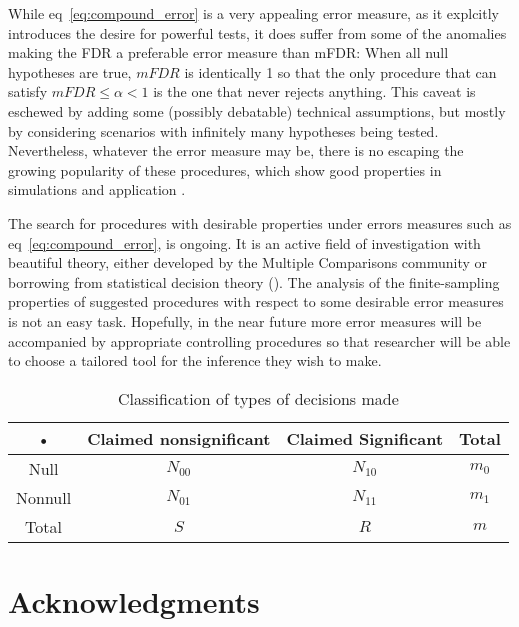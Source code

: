 \documentclass[draft,12pt]{article}
\begin{document}
While eq~\ref{eq:compound_error} is a very appealing error measure, as it explcitly introduces the desire for powerful tests, it does suffer from some of the anomalies making the FDR a preferable error measure than mFDR: When all null hypotheses are true, $mFDR$ is identically 1 so that the only procedure that can satisfy $mFDR\leq \alpha <1$ is the one that never rejects anything. This caveat is eschewed by adding some (possibly debatable) technical assumptions, but mostly by considering scenarios with infinitely many hypotheses being tested. Nevertheless, whatever the error measure may be, there is no escaping the growing popularity of these procedures, which show good properties in simulations and application \citep[example][]{efron_microarrays_2008}.

The search for procedures with desirable properties under errors measures such as eq~\ref{eq:compound_error}, is ongoing. It is an active field of investigation with beautiful theory, either developed by the Multiple Comparisons community or borrowing from statistical decision theory (\cite[see][]{sun_oracle_2007}). The analysis of the finite-sampling properties of suggested procedures with respect to some desirable error measures is not an easy task. Hopefully, in the near future more error measures will be accompanied by appropriate controlling procedures so that researcher will be able to choose a tailored tool for the inference they wish to make.


\begin{table}
  \centering
\begin{tabular}{|c|c|c|c|}
\hline \rule[-1ex]{0pt}{1.5ex} • & Claimed nonsignificant & Claimed Significant & Total \\ 
\hline
\hline \rule[-1ex]{0pt}{1.5ex} Null & $N_{00}$ & $N_{10}$ & $m_0$ \\ 
\hline \rule[-1ex]{0pt}{1.5ex} Nonnull & $N_{01}$ & $N_{11}$ & $m_1$ \\ 
\hline \rule[-1ex]{0pt}{1.5ex} Total & $S$ & $R$ & $m$ \\ 
\hline 
\end{tabular} 
  \caption{Classification of types of decisions made}
  \label{tab:event_notation}
\end{table}






\section{Acknowledgments}
\end{document}
